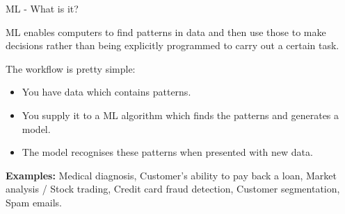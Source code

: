 \documentclass{beamer}
\begin{document}
\begin{frame}{ML - What is it?}
	\begin{flushleft}
			ML enables computers to find patterns in data and then use those to make decisions rather than being explicitly programmed to carry out a certain task.
	\end{flushleft}
\justify
The workflow is pretty simple:
	\begin{itemize}
		\item You have data which contains patterns.
		\item You supply it to a ML algorithm which finds the patterns and generates a model.
		\item The model recognises these patterns when presented with new data.
	\end{itemize}
\justify
	\textbf{Examples:} Medical diagnosis, Customer’s ability to pay back a loan, Market analysis / Stock trading, Credit card fraud detection, Customer segmentation, Spam emails.
\end{frame}
\end{document}
